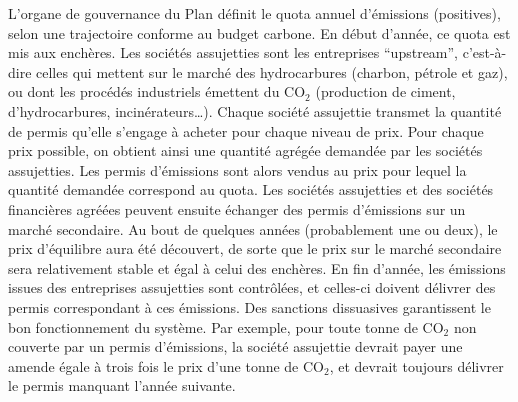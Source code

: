 \documentclass[a5paper,french]{memoir}
\begin{document}
L'organe de gouvernance du Plan définit le quota annuel d'émissions (positives), selon une trajectoire conforme au budget carbone. En début d'année, ce quota est mis aux enchères. %
Les sociétés assujetties sont les entreprises ``upstream'', c'est-à-dire celles qui mettent sur le marché des hydrocarbures (charbon, pétrole et gaz), ou dont les procédés industriels émettent du CO$_\text{2}$ (production de ciment, d'hydrocarbures, incinérateurs\dots). 
Chaque société assujettie transmet la quantité de permis qu'elle s'engage à acheter pour chaque niveau de prix. Pour chaque prix possible, on obtient ainsi une quantité agrégée demandée par les sociétés assujetties. Les permis d'émissions sont alors vendus au prix pour lequel la quantité demandée correspond au quota. Les sociétés assujetties et des sociétés financières agréées peuvent ensuite échanger des permis d'émissions sur un marché secondaire. Au bout de quelques années (probablement une ou deux), le prix d'équilibre aura été découvert, de sorte que le prix sur le marché secondaire sera relativement stable et égal à celui des enchères. En fin d'année, les émissions issues des entreprises assujetties sont contrôlées, et celles-ci doivent délivrer des permis correspondant à ces émissions. Des sanctions dissuasives garantissent le bon fonctionnement du système. Par exemple, pour toute tonne de CO$_\text{2}$ non couverte par un permis d'émissions, la société assujettie devrait payer une amende égale à trois fois le prix d'une tonne de CO$_\text{2}$, et devrait toujours délivrer le permis manquant l'année suivante. %
\end{document}
